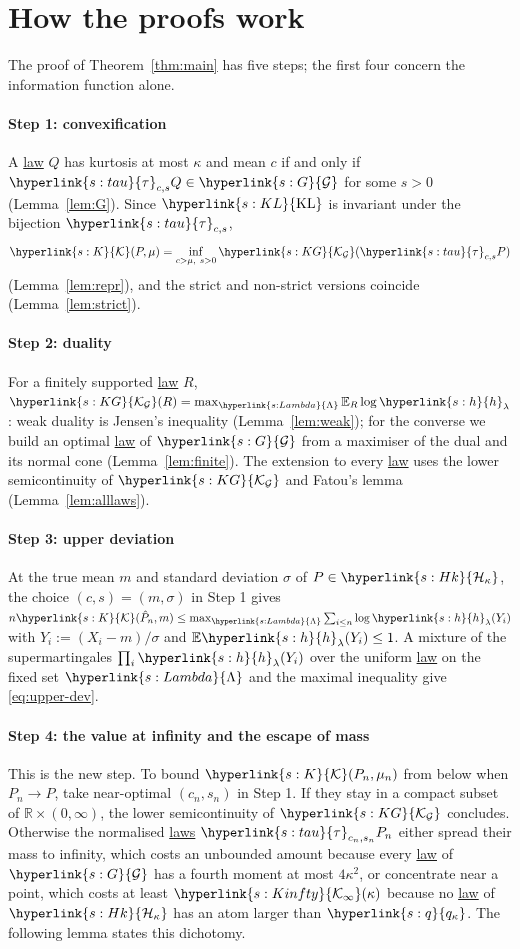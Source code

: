 \documentclass[11pt]{article}
\newcommand{\E}{\mathbb{E}}
\newcommand{\R}{\mathbb{R}}
\newcommand{\sy}[2]{{\hyperlink{#1}{#2}}}
\newcommand{\term}[2]{\hyperlink{#1}{#2}}
\newcommand{\KL}{\sy{s:KL}{\mathrm{KL}}}
\newcommand{\Hk}{\sy{s:Hk}{\mathcal{H}_{\kappa}}}
\newcommand{\Kc}{\sy{s:K}{\mathcal{K}}}
\newcommand{\Gk}{\sy{s:G}{\mathcal{G}}}
\newcommand{\KG}{\sy{s:KG}{\mathcal{K}_{\mathcal{G}}}}
\newcommand{\tauc}{\sy{s:tau}{\tau}}
\newcommand{\hl}{\sy{s:h}{h}}
\newcommand{\Lam}{\sy{s:Lambda}{\Lambda}}
\newcommand{\qk}{\sy{s:q}{q_{\kappa}}}
\newcommand{\Kinfty}{\sy{s:Kinfty}{\mathcal{K}_{\infty}}}
\begin{document}
\section{How the proofs work}\label{sec:overview}

The proof of Theorem~\ref{thm:main} has five steps; the first four concern the information function alone.

\paragraph{Step 1: convexification} A \term{w:law}{law} $Q$ has kurtosis at most $\kappa$ and mean $c$ if and only if
$\tauc_{c,s}Q\in\Gk$ for some $s>0$ (Lemma~\ref{lem:G}). Since $\KL$ is invariant under the bijection $\tauc_{c,s}$,
\begin{equation*}
  \Kc(P,\mu)=\inf_{c>\mu,\ s>0}\KG(\tauc_{c,s}P)
\end{equation*}
(Lemma~\ref{lem:repr}), and the strict and non-strict versions coincide (Lemma~\ref{lem:strict}).

\paragraph{Step 2: duality} For a finitely supported \term{w:law}{law} $R$, $\KG(R)=\max_{\Lam}\E_R\log\hl_\lambda$: weak duality
is Jensen's inequality (Lemma~\ref{lem:weak}); for the converse we build an optimal \term{w:law}{law} of $\Gk$ from a
maximiser of the dual and its normal cone (Lemma~\ref{lem:finite}). The extension to every \term{w:law}{law} uses the lower
semicontinuity of $\KG$ and Fatou's lemma (Lemma~\ref{lem:alllaws}).

\paragraph{Step 3: upper deviation} At the true mean $m$ and standard deviation $\sigma$ of $P\in\Hk$, the
choice $(c,s)=(m,\sigma)$ in Step 1 gives $n\Kc(\hat P_n,m)\le\max_{\Lam}\sum_{i\le n}\log\hl_\lambda(Y_i)$ with
$Y_i:=(X_i-m)/\sigma$ and $\E\hl_\lambda(Y_i)\le1$. A mixture of the supermartingales $\prod_i\hl_\lambda(Y_i)$ over
the uniform \term{w:law}{law} on the fixed set $\Lam$ and the maximal inequality give \eqref{eq:upper-dev}.

\paragraph{Step 4: the value at infinity and the escape of mass} This is the new step. To bound
$\Kc(P_n,\mu_n)$ from below when $P_n\to P$, take near-optimal $(c_n,s_n)$ in Step 1. If they stay in a
compact subset of $\R\times(0,\infty)$, the lower semicontinuity of $\KG$ concludes. Otherwise the
normalised \term{w:law}{laws} $\tauc_{c_n,s_n}P_n$ either spread their mass to infinity, which costs an unbounded amount
because every \term{w:law}{law} of $\Gk$ has a fourth moment at most $4\kappa^2$, or concentrate near a point, which costs
at least $\Kinfty(\kappa)$ because no \term{w:law}{law} of $\Hk$ has an atom larger than $\qk$. The following lemma states
this dichotomy.
\end{document}
